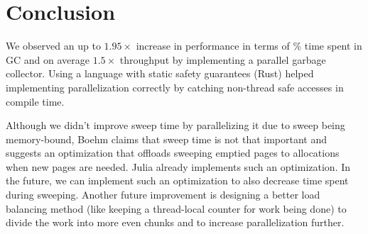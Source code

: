 \section{Conclusion} \label{conclusion}

We observed an up to $1.95\times$ increase in performance in terms of \% time spent in GC and on average $1.5\times$ throughput by implementing a parallel garbage collector.
Using a language with static safety guarantees (Rust) helped implementing parallelization correctly by catching non-thread safe accesses in compile time.

Although we didn't improve sweep time by parallelizing it due to sweep being memory-bound, Boehm\cite{boehm1991mostly} claims that sweep time is not that important and suggests an optimization that offloads sweeping emptied pages to allocations when new pages are needed.
Julia already implements such an optimization.
In the future, we can implement such an optimization to also decrease time spent during sweeping.
Another future improvement is designing a better load balancing method (like keeping a thread-local counter for work being done) to divide the work into more even chunks and to increase parallelization further.

